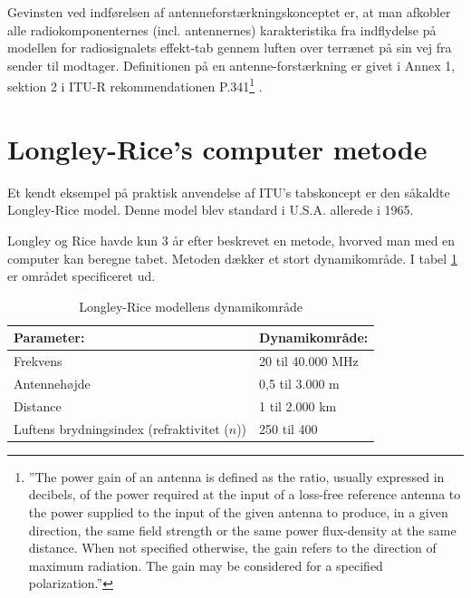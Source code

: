 Gevinsten ved indførelsen af antenneforstærkningskonceptet er, at man afkobler alle radiokomponenternes (incl. antennernes) karakteristika fra indflydelse på modellen for radiosignalets effekt-tab gennem luften over terrænet på sin vej fra sender til modtager. Definitionen på en antenne-forstærkning er givet i Annex 1, sektion 2 i ITU-R rekommendationen P.341\footnote{''The power gain of an antenna is defined as the ratio, usually expressed in decibels, of the power required at the input of a loss-free reference antenna to the power supplied to the input of the given antenna to produce, in a given direction, the same field strength or the same power flux-density at the same distance. When not specified otherwise, the gain refers to the direction of maximum radiation. The gain may be considered for a specified polarization.''} \cite{itur_p341-5}.

\section{Longley-Rice's computer metode}
Et kendt eksempel på praktisk anvendelse af ITU's tabskoncept er den såkaldte Longley-Rice model. Denne model blev standard i U.S.A. allerede i 1965\cite{nbs-tn101}.

Longley og Rice havde kun 3 år efter beskrevet en metode, hvorved man med en computer kan beregne tabet\cite{ntis-ad676874}. Metoden dækker et stort dynamikområde. I tabel \ref{tab:lr-range} er området specificeret ud.

\begin{table}[h]
 \centering
 \begin{tabular}{ll}
   Parameter:                                   & Dynamikområde:    \\
   \hline
   Frekvens                                     & 20 til 40.000 MHz  \\
   Antennehøjde                                 & 0,5 til 3.000 m \\
   Distance                                     & 1 til 2.000 km  \\
   Luftens brydningsindex (refraktivitet ($n$)) & 250 til 400 \\
 \end{tabular}
 \caption{Longley-Rice modellens dynamikområde}
 \label{tab:lr-range}
\end{table}


